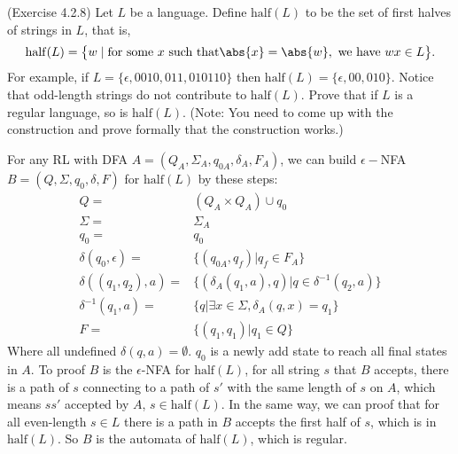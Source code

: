 \documentclass[10pt]{homework}
\begin{document}
\begin{problem} (Exercise 4.2.8)
  Let $L$ be a language.
  Define $\mathrm{half}(L)$ to be the set of first halves of strings in $L$,
  that is,
  \begin{equation*}
    \mathrm{half}(L) = \bigl\{w \mid \text{for some } x \text{ such that}
    \abs{x} = \abs{w}, \text{ we have } wx \in L \bigr\}.
  \end{equation*}
  For example, if $L = \{\epsilon, 0010, 011, 010110\}$ then
  $\mathrm{half}(L) = \{\epsilon, 00, 010\}$.
  Notice that odd-length strings do not contribute to $\mathrm{half}(L)$.
  Prove that if $L$ is a regular language, so is $\mathrm{half}(L)$.
  (Note: You need to come up with the construction and prove formally that
  the construction works.)
\end{problem}

\begin{solution}
    For any RL with DFA $A=(Q_A,\Sigma_A,q_{0A},\delta_A,F_A)$, we can build $\epsilon-$NFA $B=(Q,\Sigma,q_0,\delta,F)$ for $\mathrm{half}(L)$ by these steps:
    \begin{align}
        Q=&(Q_A\times Q_A)\cup q_0\\
        \Sigma=&\Sigma_A\\
        q_0=&q_0\\
        \delta(q_0,\epsilon)=&\{(q_{0A},q_f)|q_f\in F_A\}\\
        \delta((q_1,q_2),a)=&\{(\delta_A(q_1,a),q)|q\in \delta^{-1}(q_2,a)\}\\
        \delta^{-1}(q_1,a)=&\{q|\exists x\in \Sigma,\delta_A(q,x)=q_1\}\\
        F=&\{(q_1,q_1)|q_1\in Q\}
    \end{align}
    Where all undefined $\delta(q,a)=\emptyset$. $q_0$ is a newly add state to reach all final states in $A$. To proof $B$ is the $\epsilon$-NFA for $\mathrm{half}(L)$, for all string $s$ that $B$ accepts, there is a path of $s$ connecting to a path of $s'$ with the same length of $s$ on $A$, which means $s s'$ accepted by $A$, $s\in \mathrm{half}(L)$. In the same way, we can proof that for all even-length $s\in L$ there is a path in $B$ accepts the first half of $s$, which is in $\mathrm{half}(L)$. So $B$ is the automata of $\mathrm{half}(L)$, which is regular.
\end{solution}
\end{document}
